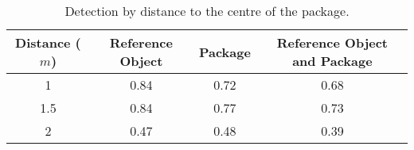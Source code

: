 \begin{table}[H]
\centering
\begin{tabular}{@{} *4c @{}}
\toprule
 \multicolumn{1}{c}{Distance ($m$)} & Reference Object  & Package  & Reference Object and Package  \\ 
\midrule
 1 	& 0.84 & 0.72 & 0.68 \\ 
 1.5 & 0.84 & 0.77 & 0.73 \\
 2 	& 0.47 & 0.48 & 0.39 \\
\bottomrule
 \end{tabular}
 \caption{Detection by distance to the centre of the package.}
\label{table:detection_by_distance}
\end{table}